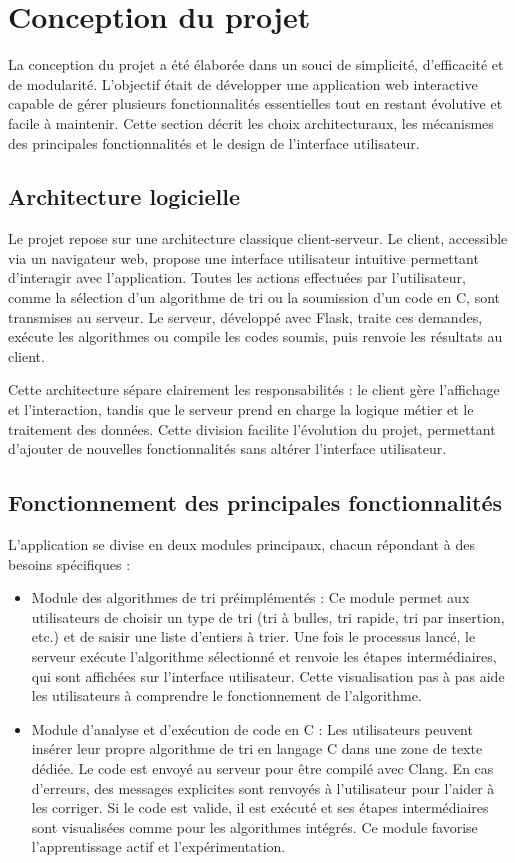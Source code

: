 \documentclass[a4paper, 12pt, twoside]{article}
\begin{document}
    \newpage
\section{Conception du projet}
\vspace{40pt}
La conception du projet a été élaborée dans un souci de simplicité, d’efficacité et de modularité. L’objectif était de développer une application web interactive capable de gérer plusieurs fonctionnalités essentielles tout en restant évolutive et facile à maintenir. Cette section décrit les choix architecturaux, les mécanismes des principales fonctionnalités et le design de l’interface utilisateur.
\vspace{30pt}
\subsection{Architecture logicielle}
Le projet repose sur une architecture classique client-serveur. Le client, accessible via un navigateur web, propose une interface utilisateur intuitive permettant d’interagir avec l’application. Toutes les actions effectuées par l’utilisateur, comme la sélection d’un algorithme de tri ou la soumission d’un code en C, sont transmises au serveur. Le serveur, développé avec Flask, traite ces demandes, exécute les algorithmes ou compile les codes soumis, puis renvoie les résultats au client.

Cette architecture sépare clairement les responsabilités : le client gère l’affichage et l’interaction, tandis que le serveur prend en charge la logique métier et le traitement des données. Cette division facilite l’évolution du projet, permettant d’ajouter de nouvelles fonctionnalités sans altérer l’interface utilisateur.
\vspace{30pt}
\subsection{Fonctionnement des principales fonctionnalités}
L’application se divise en deux modules principaux, chacun répondant à des besoins spécifiques :
\begin{itemize}
\item Module des algorithmes de tri préimplémentés :
Ce module permet aux utilisateurs de choisir un type de tri (tri à bulles, tri rapide, tri par insertion, etc.) et de saisir une liste d’entiers à trier. Une fois le processus lancé, le serveur exécute l’algorithme sélectionné et renvoie les étapes intermédiaires, qui sont affichées sur l’interface utilisateur. Cette visualisation pas à pas aide les utilisateurs à comprendre le fonctionnement de l’algorithme.
\item Module d’analyse et d’exécution de code en C :
 Les utilisateurs peuvent insérer leur propre algorithme de tri en langage C dans une zone de texte dédiée. Le code est envoyé au serveur pour être compilé avec Clang. En cas d’erreurs, des messages explicites sont renvoyés à l’utilisateur pour l’aider à les corriger. Si le code est valide, il est exécuté et ses étapes intermédiaires sont visualisées comme pour les algorithmes intégrés. Ce module favorise l’apprentissage actif et l’expérimentation.
\end{itemize}
\vspace{30pt}
\end{document}
